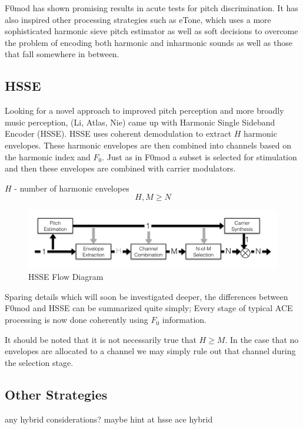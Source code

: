 \documentclass [11pt, proquest] {uwthesis}[2015/03/03]
\begin{document}
F0mod has shown promising results in acute tests for pitch discrimination.  It has also inspired other processing strategies such as eTone, which uses a more sophisticated harmonic sieve pitch estimator as well as soft decisions to overcome the problem of encoding both harmonic and inharmonic sounds as well as those that fall somewhere in between.

\subsection{HSSE}

Looking for a novel approach to improved pitch perception and more broadly music perception, (Li, Atlas, Nie) came up with Harmonic Single Sideband Encoder (HSSE).  HSSE uses coherent demodulation to extract $H$ harmonic envelopes.  These harmonic envelopes are then combined into channels based on the harmonic index and $F_0$.  Just as in F0mod a subset is selected for stimulation and then these envelopes are combined with carrier modulators.

$H$ - number of harmonic envelopes
$$H, M \geq N$$

\begin{figure}[!ht]
  \centering
    \includegraphics[width=1\textwidth]{HSSE_flow_diagramTEMP}   
    \caption{HSSE Flow Diagram}
\end{figure}

Sparing details which will soon be investigated deeper, the differences between F0mod and HSSE can be summarized quite simply;  Every stage of typical ACE processing is now done coherently using $F_0$ information.

It should be noted that it is not necessarily true that $H \geq M$.  In the case that no envelopes are allocated to a channel we may simply rule out that channel during the selection stage.

\subsection{Other Strategies}

any hybrid considerations?  maybe hint at hsse ace hybrid
\end{document}
